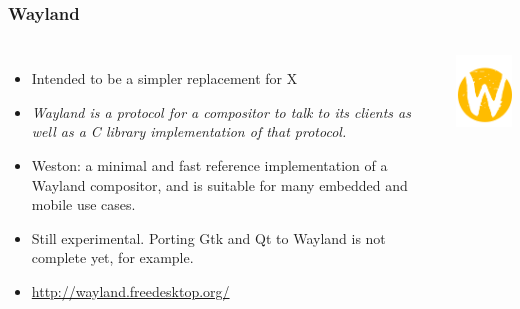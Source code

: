 \begin{frame}
  \frametitle{Wayland}
  \begin{columns}[T]
    \begin{itemize}
    \item Intended to be a simpler replacement for X
    \item {\em Wayland is a protocol for a compositor to talk to 
    its clients as well as a C library implementation of that protocol.}
    \item Weston: a minimal and fast reference implementation
          of a Wayland compositor, and is suitable for many embedded
          and mobile use cases.
    \item Still experimental. Porting Gtk and Qt 
          to Wayland is not complete yet, for example.
    \item \url{http://wayland.freedesktop.org/}
    \end{itemize}
    \includegraphics[width=\textwidth]{slides/sysdev-embedded-linux/wayland.png}
  \end{columns}
\end{frame}

